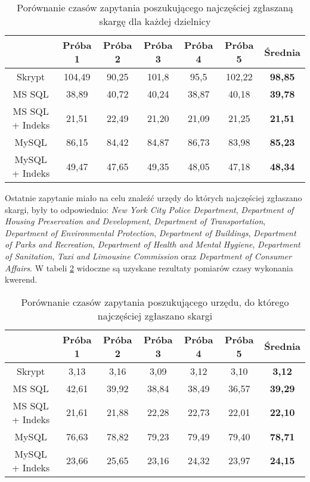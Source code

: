 \documentclass[a4paper,11pt]{article}
\begin{document}
\begin{table}[h!]
\begin{center}
\caption{Porównanie czasów zapytania poszukującego najczęściej zgłaszaną skargę dla każdej dzielnicy}
\label{tab:query2}
\begin{tabular}{|c|c|c|c|c|c|c|}
\hline
 & Próba 1 & Próba 2 & Próba 3 & Próba 4 & Próba 5 & \textbf{Średnia} \\ \hline
Skrypt & 104,49 & 90,25 & 101,8 & 95,5 & 102,22 & \textbf{98,85} \\ \hline
MS SQL & 38,89 & 40,72 & 40,24 & 38,87 & 40,18 & \textbf{39,78} \\ \hline
MS SQL + Indeks & 21,51 & 22,49 & 21,20 & 21,09 & 21,25 & \textbf{21,51} \\ \hline
MySQL & 86,15 & 84,42 & 84,87 & 86,73 & 83,98 & \textbf{85,23} \\ \hline
MySQL + Indeks & 49,47 & 47,65 & 49,35 & 48,05 & 47,18 & \textbf{48,34} \\ \hline
\end{tabular}
\end{center}
\end{table}

Ostatnie zapytanie miało na celu znaleźć urzędy do których najczęściej zgłaszano skargi, były to odpowiednio: \textit{New York City Police Department}, \textit{Department of Housing Preservation and Development}, \textit{Department of Transportation}, \textit{Department of Environmental Protection}, \textit{Department of Buildings}, \textit{Department of Parks and Recreation}, \textit{Department of Health and Mental Hygiene}, \textit{Department of Sanitation}, \textit{Taxi and Limousine Commission} oraz \textit{Department of Consumer Affairs}. W tabeli \ref{tab:query3} widoczne są uzyskane rezultaty pomiarów czasy wykonania kwerend.

\begin{table}[h!]
\begin{center}
\caption{Porównanie czasów zapytania poszukującego urzędu, do którego najczęściej zgłaszano skargi}
\label{tab:query3}
\begin{tabular}{|c|c|c|c|c|c|c|}
\hline
 & Próba 1 & Próba 2 & Próba 3 & Próba 4 & Próba 5 & \textbf{Średnia} \\ \hline
Skrypt & 3,13 & 3,16 & 3,09 & 3,12 & 3,10 & \textbf{3,12} \\ \hline
MS SQL & 42,61 & 39,92 & 38,84 & 38,49 & 36,57 & \textbf{39,29} \\ \hline
MS SQL + Indeks & 21,61 & 21,88 & 22,28 & 22,73 & 22,01 & \textbf{22,10} \\ \hline
MySQL & 76,63 & 78,82 & 79,23 & 79,49 & 79,40 & \textbf{78,71} \\ \hline
MySQL + Indeks & 23,66 & 25,65 & 23,16 & 24,32 & 23,97 & \textbf{24,15} \\ \hline
\end{tabular}
\end{center}
\end{table}
\end{document}
